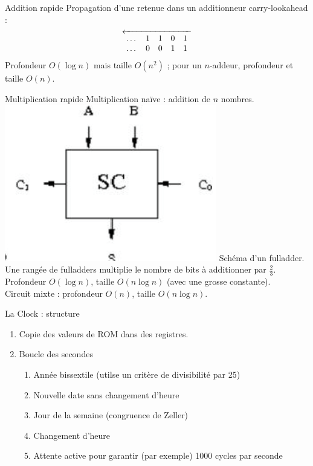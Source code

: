 \documentclass[12pt]{beamer}
\begin{document}
\begin{frame}{Addition rapide}
	Propagation d'une retenue dans un additionneur carry-lookahead :
	$$\overleftarrow{
	\begin{array}{c c c c c}
	\dots & 1 & 1 & 0 & 1 \\
	\dots & 0 & 0 & 1 & 1 
	\end{array}}$$
	Profondeur $O(\log n)$ mais taille $O(n^2)$ ; pour un $n$-addeur, profondeur et taille $O(n)$.
\end{frame}

\begin{frame}{Multiplication rapide}
	Multiplication naïve : addition de $n$ nombres.\\
	\includegraphics{fulladder} Schéma d'un fulladder.\\
	Une rangée de fulladders multiplie le nombre de bits à additionner par $\frac{2}{3}$.\\
	Profondeur $O(\log n)$, taille $O(n \log n)$ (avec une grosse constante).\\
	Circuit mixte : profondeur $O(n)$, taille $O(n \log n)$.
\end{frame}


\begin{frame}{La Clock : structure}
    \begin{enumerate}
        \item Copie des valeurs de ROM dans des registres.
        \item Boucle des secondes
        \begin{enumerate}
            \item Année bissextile (utilse un critère de divisibilité par 25)
            \item Nouvelle date sans changement d'heure
            \item Jour de la semaine (congruence de Zeller)
            \item Changement d'heure
            \item Attente active pour garantir (par exemple) 1000 cycles par seconde
        \end{enumerate}
    \end{enumerate}
\end{frame}
\end{document}
